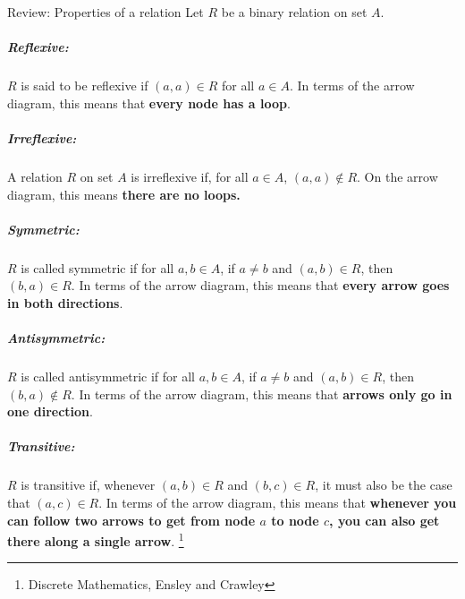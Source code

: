 \documentclass[a4paper,12pt]{book}
\begin{document}
    \begin{intro}{Review: Properties of a relation}
        Let $R$ be a binary relation on set $A$.

        \subparagraph{Reflexive:} $R$ is said to be reflexive if
        $(a,a) \in R$ for all $a \in A$. In terms of the arrow
        diagram, this means that \textbf{every node has a loop}.

        \subparagraph{Irreflexive:} A relation $R$ on set $A$ is irreflexive
        if, for all $a \in A$, $(a,a) \not\in R$. On the arrow diagram,
        this means \textbf{there are no loops.}

        \subparagraph{Symmetric:} $R$ is called symmetric if
        for all $a,b \in A$, if $a \neq b$ and $(a,b) \in R$,
        then $(b,a) \in R$. In terms of the arrow diagram, this
        means that \textbf{every arrow goes in both directions}.

        \subparagraph{Antisymmetric:} $R$ is called antisymmetric if
        for all $a,b \in A$, if $a \neq b$ and $(a,b) \in R$,
        then $(b,a) \not\in R$. In terms of the arrow diagram, this
        means that \textbf{arrows only go in one direction}.

        \subparagraph{Transitive:} $R$ is transitive if, whenever
        $(a,b) \in R$ and $(b,c) \in R$, it must also be the case
        that $(a,c) \in R$. In terms of the arrow diagram, this
        means that \textbf{whenever you can follow two arrows
        to get from node $a$ to node $c$, you can also get there
        along a single arrow}.
        \footnote{Discrete Mathematics, Ensley and Crawley}
    \end{intro}
    
\notonkey{ \newpage }{ \hrulefill }
\end{document}
